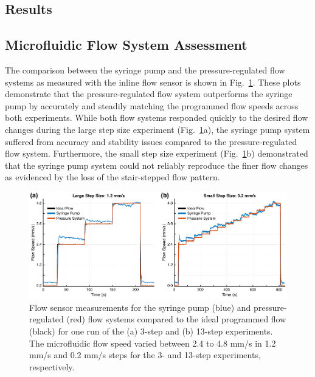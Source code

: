 \documentclass[12pt]{spieman}
\begin{document}
\begin{spacing}{2}
\section{Results}
\label{sect:results}

\subsection{Microfluidic Flow System Assessment}

The comparison between the syringe pump and the pressure-regulated flow systems as measured with the inline flow sensor is shown in Fig.~\ref{fig:SvP-FS}. These plots demonstrate that the pressure-regulated flow system outperforms the syringe pump by accurately and steadily matching the programmed flow speeds across both experiments. While both flow systems responded quickly to the desired flow changes during the large step size experiment (Fig.~\ref{fig:SvP-FS}a), the syringe pump system suffered from accuracy and stability issues compared to the pressure-regulated flow system. Furthermore, the small step size experiment (Fig.~\ref{fig:SvP-FS}b) demonstrated that the syringe pump system could not reliably reproduce the finer flow changes as evidenced by the loss of the stair-stepped flow pattern.

\begin{figure}
    \includegraphics[width=\textwidth]{Figure4.pdf}
    \caption {
        Flow sensor measurements for the syringe pump (blue) and pressure-regulated (red) flow systems compared to the ideal programmed flow (black) for one run of the (a) 3-step and (b) 13-step experiments. The microfluidic flow speed varied between 2.4 to 4.8 mm/s in 1.2 mm/s and 0.2 mm/s steps for the 3- and 13-step experiments, respectively.
    }
    \label{fig:SvP-FS}
\end{figure}


\end{spacing}
\end{document}
